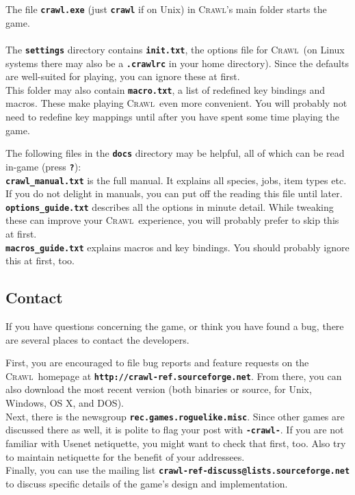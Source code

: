 \documentclass[a4paper,10pt]{article}
\newcommand{\key}[1]{{{\texttt{\textbf{#1}}}}} %
\newcommand{\crawl}{\textsc{Crawl}}
\newcommand{\spacecolumn}{\begin{minipage}[t]{2cm}\phantom{xxxx}\end{minipage}}
\begin{document}
\begin{minipage}[t]{7cm}
The file \key{crawl.exe} (just \key{crawl} if on Unix) in \crawl's main 
folder starts the game.
\\ \\
The \key{settings} directory contains \key{init.txt}, the options file for
\crawl\ (on Linux systems there may also be a \key{.crawlrc} in your home
directory). Since the defaults are well-suited for playing, you can ignore
these at first.
\\
This folder may also contain \key{macro.txt}, a list of redefined key 
bindings and macros. These make playing \crawl\ even more convenient. 
You will probably not need to redefine key mappings until after you have
spent some time playing the game.
\end{minipage}
%
\spacecolumn
%
\begin{minipage}[t]{7cm}
The following files in the \key{docs} directory may be helpful, all of
which can be read in-game (press \key{?}):
\\
\key{crawl\_manual.txt} is the full manual. It explains all species, jobs, 
item types etc. If you do not delight in manuals, you can put off the 
reading this file until later.
\\
\key{options\_guide.txt} describes all the options in minute detail. While
tweaking these can improve your \crawl\ experience, you will probably prefer
to skip this at first.
\\
\key{macros\_guide.txt} explains macros and key bindings. You should probably
ignore this at first, too.
\end{minipage}

\subsection*{Contact}
	    
If you have questions concerning the game, or think you have found a bug, 
there are several places to contact the developers. 

First, you are encouraged to file bug reports and feature requests on the 
\crawl\ homepage at \key{http://crawl-ref.sourceforge.net}. From there, you 
can also download the most recent version (both binaries or source, for 
Unix, Windows, OS X, and DOS).
\\
Next, there is the newsgroup \key{rec.games.roguelike.misc}. Since other 
games are discussed there as well, it is polite to flag your post with 
\key{-crawl-}. If you are not familiar with Usenet netiquette, you might 
want to check that first, too. Also try to maintain netiquette for the 
benefit of your addressees.
\\
Finally, you can use the mailing list 
\key{crawl-ref-discuss@lists.sourceforge.net}
to discuss specific details of the game's design and implementation.
\end{document}
